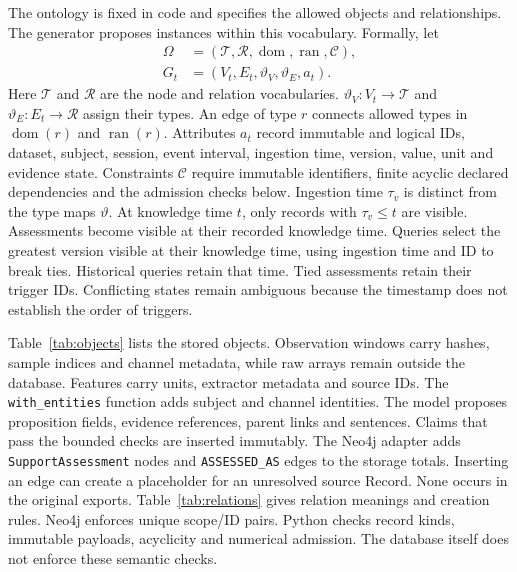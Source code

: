 \documentclass[runningheads]{llncs}
\begin{document}
The ontology is fixed in code and specifies the allowed objects and relationships.
The generator proposes instances within this vocabulary. Formally, let
\begin{equation}
\begin{split}
 \Omega&=(\mathcal T,\mathcal R,\operatorname{dom},\operatorname{ran},\mathcal C),\\
 G_t&=(V_t,E_t,\vartheta_V,\vartheta_E,a_t).
\end{split}
\label{eq:ontology}
\end{equation}
Here $\mathcal T$ and $\mathcal R$ are the node and relation vocabularies.
$\vartheta_V:V_t\to\mathcal T$ and $\vartheta_E:E_t\to\mathcal R$
assign their types. An edge of type $r$ connects allowed types in
$\operatorname{dom}(r)$ and $\operatorname{ran}(r)$. Attributes $a_t$ record
immutable and logical IDs, dataset, subject, session, event interval, ingestion
time, version, value, unit and evidence state. Constraints $\mathcal C$ require
immutable identifiers, finite acyclic declared dependencies and the admission
checks below. Ingestion time $\tau_v$ is distinct from the type maps $\vartheta$.
At knowledge time $t$, only records with $\tau_v\leq t$ are visible.
Assessments become visible at their recorded knowledge time.
Queries select the greatest version visible at their knowledge time,
using ingestion time and ID to break ties. Historical queries retain that time. Tied assessments retain their trigger IDs. Conflicting states
remain ambiguous because the timestamp does not establish the order of triggers.

Table~\ref{tab:objects} lists the stored objects. Observation windows carry hashes,
sample indices and channel metadata, while raw arrays remain outside the database.
Features carry units, extractor metadata and source IDs. The
\texttt{with\_entities} function adds subject and channel identities.
The model proposes proposition fields, evidence references, parent links and
sentences. Claims that pass the bounded checks are inserted immutably.
The Neo4j adapter adds \texttt{SupportAssessment} nodes and
\texttt{ASSESSED\_AS} edges to the storage totals.
Inserting an edge can create a placeholder for an unresolved source Record.
None occurs in the original exports. Table~\ref{tab:relations} gives relation
meanings and creation rules. Neo4j enforces unique scope/ID pairs.
Python checks record kinds, immutable payloads, acyclicity and numerical
admission. The database itself does not enforce these semantic checks.
\end{document}
